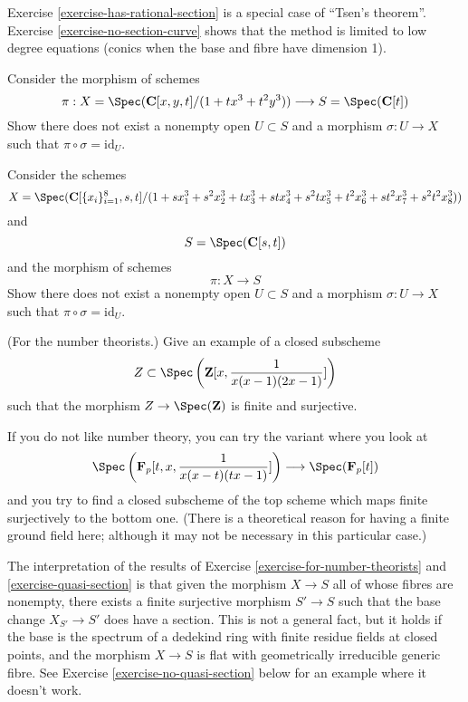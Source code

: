 \begin{remark}
\label{remark-tsen}
Exercise \ref{exercise-has-rational-section}
is a special case of ``Tsen's theorem''.
Exercise \ref{exercise-no-section-curve} shows that the
method is limited to low degree equations (conics when the base and
fibre have dimension 1).
\end{remark}

\begin{exercise}
\label{exercise-no-section-curve}
Consider the morphism of schemes
$$
\pi :
X = \Spec(\mathbf{C}[x, y, t]
/(1 + t x^3 + t^2 y^3))
\longrightarrow
S = \Spec(\mathbf{C}[t])
$$
Show there does not exist a nonempty open $U \subset S$ and
a morphism $\sigma : U \to X$ such that $\pi \circ \sigma = \text{id}_U$.
\end{exercise}

\begin{exercise}
\label{exercise-no-section-surface}
Consider the schemes
$$
X = \Spec(\mathbf{C}[\{x_i\}_{i = 1}^{8}, s, t]
/(1 + s x_1^3 + s^2 x_2^3 +
t x_3^3 + st x_4^3 + s^2t x_5^3 +
t^2 x_6^3 + st^2 x_7^3 + s^2t^2 x_8^3))
$$
and
$$
S = \Spec(\mathbf{C}[s, t])
$$
and the morphism of schemes
$$
\pi : X \longrightarrow S
$$
Show there does not exist a nonempty open $U \subset S$ and
a morphism $\sigma : U \to X$ such that $\pi \circ \sigma = \text{id}_U$.
\end{exercise}

\begin{exercise}
\label{exercise-for-number-theorists}
(For the number theorists.) Give an example of a closed subscheme
$$
Z \subset \Spec\left({\mathbf Z}[x, \frac{1 }{ x(x-1)(2x-1)}]\right)
$$
such that the morphism $Z \to \Spec({\mathbf Z})$ is finite
and surjective.
\end{exercise}

\begin{exercise}
\label{exercise-quasi-section}
If you do not like number theory, you can try the
variant where you look at
$$
\Spec\left({\mathbf F}_p[t, x, \frac{1 }{ x(x-t)(tx-1)}]\right)
\longrightarrow
\Spec({\mathbf F}_p[t])
$$
and you try to find a closed subscheme of the top scheme
which maps finite surjectively to the bottom one. (There is a
theoretical reason for having a finite ground field here; although
it may not be necessary in this particular case.)
\end{exercise}

\begin{remark}
\label{remark-interpretation-skolem-noether}
The interpretation of the results of
Exercise \ref{exercise-for-number-theorists} and \ref{exercise-quasi-section}
is that given the morphism $X \to S$ all of whose fibres are nonempty,
there exists a finite surjective morphism $S' \to S$ such that
the base change $X_{S'} \to S'$ does have a section.
This is not a general fact, but it holds if the base is the spectrum of a
dedekind ring with finite residue fields at closed points, and
the morphism $X \to S$ is flat with geometrically irreducible generic
fibre. See Exercise \ref{exercise-no-quasi-section} below for an example
where it doesn't work.
\end{remark}

